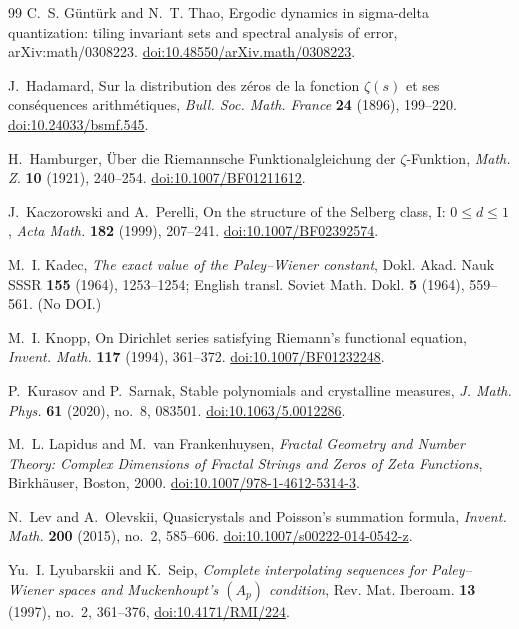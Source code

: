 \documentclass[11pt,reqno]{amsart}
\numberwithin{equation}{section}
\theoremstyle{plain}
\theoremstyle{definition}
\theoremstyle{remark}
\begin{document}
\begin{thebibliography}{99}
C.~S. G\"unt\"urk and N.~T. Thao, Ergodic dynamics in sigma-delta quantization: tiling invariant sets and spectral analysis of error, arXiv:math/0308223.
\href{https://doi.org/10.48550/arXiv.math/0308223}{doi:10.48550/arXiv.math/0308223}.

J.~Hadamard, Sur la distribution des z\'eros de la fonction $\zeta(s)$ et ses cons\'equences arithm\'etiques, \emph{Bull. Soc. Math. France} \textbf{24} (1896), 199--220.
\href{https://doi.org/10.24033/bsmf.545}{doi:10.24033/bsmf.545}.

H.~Hamburger, \"Uber die Riemannsche Funktionalgleichung der $\zeta$-Funktion, \emph{Math. Z.} \textbf{10} (1921), 240--254.
\href{https://doi.org/10.1007/BF01211612}{doi:10.1007/BF01211612}.

J.~Kaczorowski and A.~Perelli, On the structure of the Selberg class, I: $0\le d\le1$, \emph{Acta Math.} \textbf{182} (1999), 207--241.
\href{https://doi.org/10.1007/BF02392574}{doi:10.1007/BF02392574}.

M.~I. Kadec, \emph{The exact value of the Paley--Wiener constant}, Dokl. Akad. Nauk SSSR \textbf{155} (1964), 1253--1254; English transl. Soviet Math. Dokl. \textbf{5} (1964), 559--561. (No DOI.)

M.~I. Knopp, On Dirichlet series satisfying Riemann's functional equation, \emph{Invent. Math.} \textbf{117} (1994), 361--372.
\href{https://doi.org/10.1007/BF01232248}{doi:10.1007/BF01232248}.

P.~Kurasov and P.~Sarnak, Stable polynomials and crystalline measures, \emph{J. Math. Phys.} \textbf{61} (2020), no.~8, 083501.
\href{https://doi.org/10.1063/5.0012286}{doi:10.1063/5.0012286}.

M.~L. Lapidus and M.~van Frankenhuysen, \emph{Fractal Geometry and Number Theory: Complex Dimensions of Fractal Strings and Zeros of Zeta Functions}, Birkh\"auser, Boston, 2000.
\href{https://doi.org/10.1007/978-1-4612-5314-3}{doi:10.1007/978-1-4612-5314-3}.

N.~Lev and A.~Olevskii, Quasicrystals and Poisson's summation formula, \emph{Invent. Math.} \textbf{200} (2015), no.~2, 585--606.
\href{https://doi.org/10.1007/s00222-014-0542-z}{doi:10.1007/s00222-014-0542-z}.

Yu.~I. Lyubarskii and K.~Seip, \emph{Complete interpolating sequences for Paley--Wiener spaces and Muckenhoupt's $(A_p)$ condition}, Rev. Mat. Iberoam. \textbf{13} (1997), no.~2, 361--376, \href{https://doi.org/10.4171/RMI/224}{doi:10.4171/RMI/224}.


\end{thebibliography}
\end{document}
